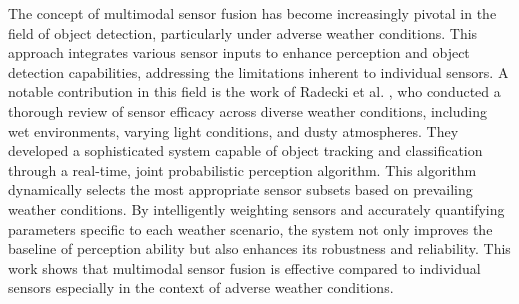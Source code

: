 \documentclass[report.tex]{subfiles}
\begin{document}



    The concept of multimodal sensor fusion has become increasingly pivotal in the field of object detection, particularly under adverse weather conditions. This approach integrates various sensor inputs to enhance perception and object detection capabilities, addressing the limitations inherent to individual sensors. A notable contribution in this field is the work of Radecki et al. \cite{radecki2016all}, who conducted a thorough review of sensor efficacy across diverse weather conditions, including wet environments, varying light conditions, and dusty atmospheres. They developed a sophisticated system capable of object tracking and classification through a real-time, joint probabilistic perception algorithm. This algorithm dynamically selects the most appropriate sensor subsets based on prevailing weather conditions. By intelligently weighting sensors and accurately quantifying parameters specific to each weather scenario, the system not only improves the baseline of perception ability but also enhances its robustness and reliability. This work shows that multimodal sensor fusion is effective compared to individual sensors especially in the context of adverse weather conditions. 

\end{document}
